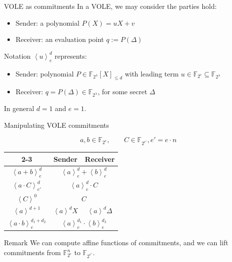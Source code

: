 \begin{frame}{VOLE as commitments}
  In a VOLE, we may consider the parties hold:
  \begin{itemize}
    \item Sender: a polynomial $P(X)=uX+v$ 
    \item Receiver: an evaluation point $q:=P(\Delta)$
  \end{itemize}
  \pause
  \pause
  \vspace{1em}
  \begin{block}{Notation}
    $\left<u\right>_e^d$ represents:
    \begin{itemize}
      \item Sender: polynomial $P\in \mathbb{F}_{2^\lambda}[X]_{\scriptscriptstyle\leqslant d}$ with leading term $u\in \mathbb{F}_{2^e}\subseteq\mathbb{F}_{2^\lambda}$
      \item Receiver: $q=P(\Delta)\in \mathbb{F}_{2^\lambda}$, for some secret $\Delta$
    \end{itemize}
    In general $d=1$ and $e=1$.
  \end{block}
\end{frame}

\begin{frame}{Manipulating VOLE commitments}
  \begin{center}
    \vspace{-1em}
    $$a,b\in \mathbb{F}_{2^e},\qquad C\in \mathbb{F}_{2^{e'}},e'{=}e{\cdot}n$$
    \setlength{\tabcolsep}{10pt}
    \renewcommand{\arraystretch}{1.6}
    \begin{tabular}{|c|c|c|}
      \cline{2-3}
      \multicolumn{1}{c|}{} &
      Sender & Receiver \\
      \hline
      $\left<a+b\right>_e^d$ &
      \multicolumn{2}{|c|}{$\left<a\right>_e^d+\left<b\right>_e^d$} \\
      \hline
      $\left<a{\cdot}C\right>_{e'}^{d}$ &
      \multicolumn{2}{|c|}{$\left<a\right>_e^d{\cdot}C$} \\
      \hline
      $\left<C\right>^0$ &
      \multicolumn{2}{|c|}{$C$} \\
      \hline
      $\left<a\right>^{d+1}$ &
      $\left<a\right>^dX$ & $\left<a\right>^d\Delta$ \\
      \hline
      $\left<a{\cdot}b\right>_e^{d_1+d_2}$ &
      \multicolumn{2}{|c|}{$\left<a\right>_e^{d_1}{\cdot}\left<b\right>_e^{d_2}$} \\
      \hline
    \end{tabular}
    \begin{block}{Remark}
      We can compute affine functions of commitments, and we can lift commitments from $\mathbb{F}_{2^e}^{n}$ to $\mathbb{F}_{2^{e'}}$.
    \end{block}
  \end{center}
\end{frame}


